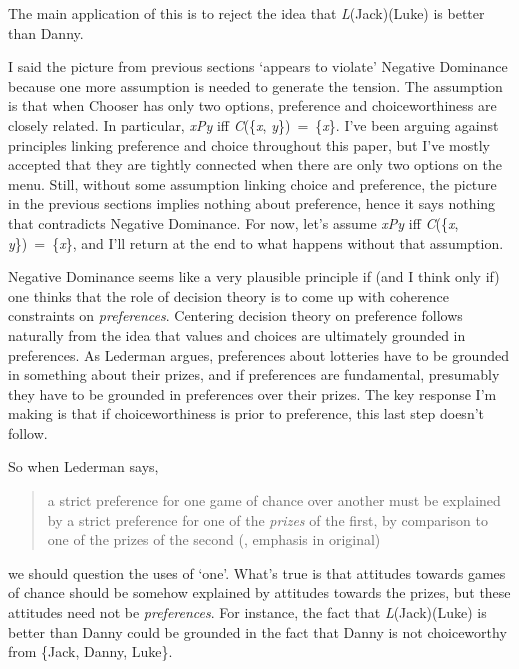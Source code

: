 \documentclass[
  11pt,
  letterpaper,
  DIV=11,
  numbers=noendperiod,
  twoside]{scrartcl}
\begin{document}
The main application of this is to reject the idea that
\emph{L}(Jack)(Luke) is better than Danny.

I said the picture from previous sections `appears to violate' Negative
Dominance because one more assumption is needed to generate the tension.
The assumption is that when Chooser has only two options, preference and
choiceworthiness are closely related. In particular, \emph{xPy} iff
\emph{C}(\{\emph{x}, \emph{y}\})~=~\{\emph{x}\}. I've been arguing
against principles linking preference and choice throughout this paper,
but I've mostly accepted that they are tightly connected when there are
only two options on the menu. Still, without some assumption linking
choice and preference, the picture in the previous sections implies
nothing about preference, hence it says nothing that contradicts
Negative Dominance. For now, let's assume \emph{xPy} iff
\emph{C}(\{\emph{x}, \emph{y}\})~=~\{\emph{x}\}, and I'll return at the
end to what happens without that assumption.

Negative Dominance seems like a very plausible principle if (and I think
only if) one thinks that the role of decision theory is to come up with
coherence constraints on \emph{preferences}. Centering decision theory
on preference follows naturally from the idea that values and choices
are ultimately grounded in preferences. As Lederman argues, preferences
about lotteries have to be grounded in something about their prizes, and
if preferences are fundamental, presumably they have to be grounded in
preferences over their prizes. The key response I'm making is that if
choiceworthiness is prior to preference, this last step doesn't follow.

So when Lederman says,

\begin{quote}
a strict preference for one game of chance over another must be
explained by a strict preference for one of the \emph{prizes} of the
first, by comparison to one of the prizes of the second
(, emphasis in
original)
\end{quote}

we should question the uses of `one'. What's true is that attitudes
towards games of chance should be somehow explained by attitudes towards
the prizes, but these attitudes need not be \emph{preferences}. For
instance, the fact that \emph{L}(Jack)(Luke) is better than Danny could
be grounded in the fact that Danny is not choiceworthy from \{Jack,
Danny, Luke\}.
\end{document}
